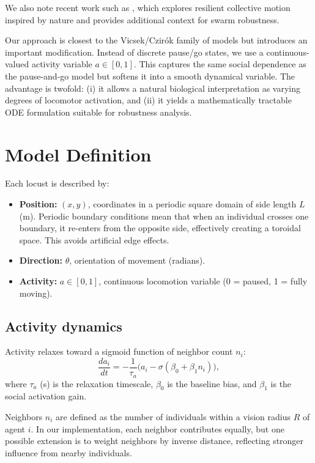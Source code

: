 \documentclass[11pt,a4paper]{article}
\begin{document}
We also note recent work such as \cite{bugswithfeatures}, which explores resilient collective motion inspired by nature and provides additional context for swarm robustness.

Our approach is closest to the Vicsek/Czirók family of models but introduces an important modification. Instead of discrete pause/go states, we use a continuous-valued activity variable $a \in [0,1]$. This captures the same social dependence as the pause-and-go model but softens it into a smooth dynamical variable. The advantage is twofold: (i) it allows a natural biological interpretation as varying degrees of locomotor activation, and (ii) it yields a mathematically tractable ODE formulation suitable for robustness analysis.


\section{Model Definition}

Each locust is described by:
\begin{itemize}
    \item \textbf{Position:} $(x,y)$, coordinates in a periodic square domain of side length $L$ (m). Periodic boundary conditions mean that when an individual crosses one boundary, it re-enters from the opposite side, effectively creating a toroidal space. This avoids artificial edge effects.
    \item \textbf{Direction:} $\theta$, orientation of movement (radians).
    \item \textbf{Activity:} $a \in [0,1]$, continuous locomotion variable (0 = paused, 1 = fully moving).
\end{itemize}

\subsection{Activity dynamics}
Activity relaxes toward a sigmoid function of neighbor count $n_i$:
\begin{equation}
\frac{da_i}{dt} = -\frac{1}{\tau_a}\Big(a_i - \sigma(\beta_0 + \beta_1 n_i)\Big),
\label{eq:activity}
\end{equation}
where $\tau_a$ (s) is the relaxation timescale, $\beta_0$ is the baseline bias, and $\beta_1$ is the social activation gain.  

Neighbors $n_i$ are defined as the number of individuals within a vision radius $R$ of agent $i$. In our implementation, each neighbor contributes equally, but one possible extension is to weight neighbors by inverse distance, reflecting stronger influence from nearby individuals.
\end{document}

